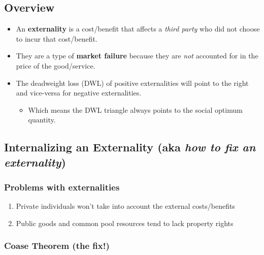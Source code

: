\documentclass[
  letterpaper,
  DIV=11,
  numbers=noendperiod]{scrartcl}
\providecommand{\tightlist}{%
  \setlength{\itemsep}{0pt}\setlength{\parskip}{0pt}}\usepackage{longtable,booktabs,array}
\begin{document}
\subsection{Overview}\label{overview}

\begin{itemize}
\tightlist
\item
  An \textbf{externality} is a cost/benefit that affects a \emph{third
  party} who did not choose to incur that cost/benefit.
\item
  They are a type of \textbf{market failure} because they are \emph{not}
  accounted for in the price of the good/service.
\item
  The deadweight loss (DWL) of positive externalities will point to the
  right and vice-versa for negative externalities.

  \begin{itemize}
  \tightlist
  \item
    Which means the DWL triangle always points to the social optimum
    quantity.
  \end{itemize}
\end{itemize}

\subsection{\texorpdfstring{Internalizing an Externality (aka \emph{how
to fix an
externality})}{Internalizing an Externality (aka how to fix an externality)}}\label{internalizing-an-externality-aka-how-to-fix-an-externality}

\subsubsection{Problems with
externalities}\label{problems-with-externalities}

\begin{enumerate}
\def\labelenumi{\arabic{enumi})}
\tightlist
\item
  Private individuals won't take into account the external
  costs/benefits
\item
  Public goods and common pool resources tend to lack property rights
\end{enumerate}

\subsubsection{Coase Theorem (the fix!)}\label{coase-theorem-the-fix}
\end{document}
